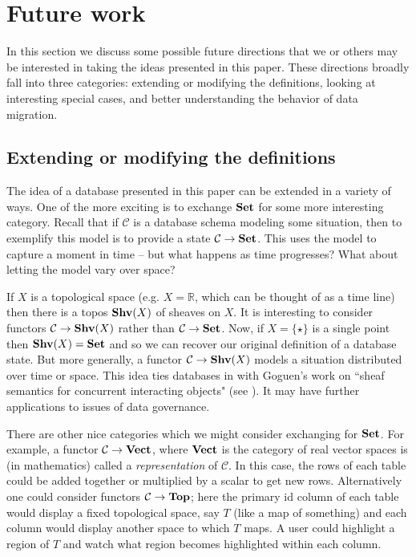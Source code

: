 \documentclass{amsart}
\def\mc{\mathcal}
\def\RR{{\mathbb R}}
\def\to{\rightarrow}
\def\Top{{\bf Top}}
\def\Set{{\bf Set}}
\def\Shv{{\bf Shv}}
\def\mcC{\mc{C}}
\theoremstyle{remark}
\theoremstyle{definition}
\def\singleton{{\{\star\}}}
\begin{document}
\section{Future work}\label{sec:future}

In this section we discuss some possible future directions that we or others may be interested in taking the ideas presented in this paper.  These directions broadly fall into three categories: extending or modifying the definitions, looking at interesting special cases, and better understanding the behavior of data migration.

\subsection{Extending or modifying the definitions}\label{sec:future1}

The idea of a database presented in this paper can be extended in a variety of ways.  One of the more exciting is to exchange $\Set$ for some more interesting category.  Recall that if $\mcC$ is a database schema modeling some situation, then to exemplify this model is to provide a state $\mcC\to\Set$.  This uses the model to capture a moment in time -- but what happens as time progresses?  What about letting the model vary over space?

If $X$ is a topological space (e.g. $X=\RR$, which can be thought of as a time line) then there is a topos $\Shv(X)$ of sheaves on $X$.  It is interesting to consider functors $\mcC\to\Shv(X)$ rather than $\mcC\to\Set$.  Now, if $X=\singleton$ is a single point then $\Shv(X)=\Set$ and so we can recover our original definition of a database state.  But more generally, a functor $\mcC\to\Shv(X)$ models a situation distributed over time or space.  This idea ties databases in with Goguen's work on ``sheaf semantics for concurrent interacting objects" (see \cite{G}).  It may have further applications to issues of data governance.

There are other nice categories which we might consider exchanging for $\Set$.  For example, a functor $\mcC\to{\bf Vect}$, where ${\bf Vect}$ is the category of real vector spaces is (in mathematics) called a {\em representation} of $\mcC$.  In this case, the rows of each table could be added together or multiplied by a scalar to get new rows.  Alternatively one could consider functors $\mcC\to\Top$; here the primary id column of each table would display a fixed topological space, say $T$ (like a map of something) and each column would display another space to which $T$ maps.  A user could highlight a region of $T$ and watch what region becomes highlighted within each column.
\end{document}
